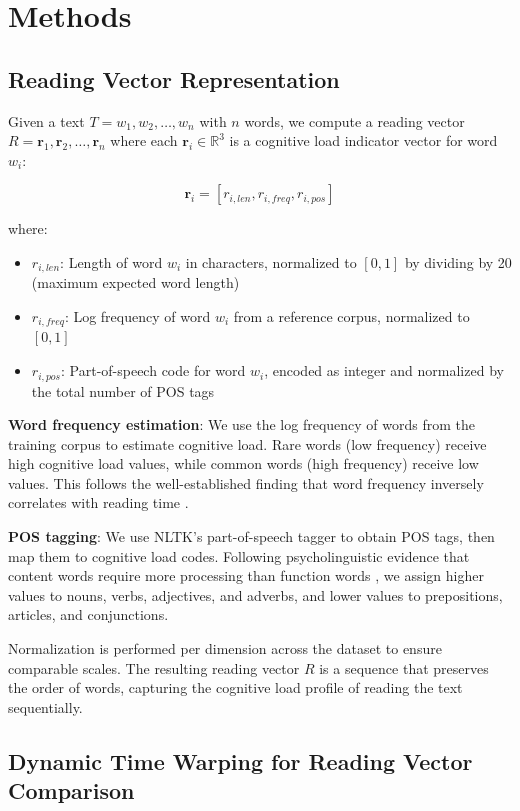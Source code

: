 \documentclass[11pt,letterpaper]{article}
\begin{document}
\section{Methods}

\subsection{Reading Vector Representation}

Given a text $T = w_1, w_2, \ldots, w_n$ with $n$ words, we compute a reading vector $R = \mathbf{r}_1, \mathbf{r}_2, \ldots, \mathbf{r}_n$ where each $\mathbf{r}_i \in \mathbb{R}^3$ is a cognitive load indicator vector for word $w_i$:

$$\mathbf{r}_i = [r_{i,len}, r_{i,freq}, r_{i,pos}]$$

where:
\begin{itemize}
\item $r_{i,len}$: Length of word $w_i$ in characters, normalized to $[0, 1]$ by dividing by 20 (maximum expected word length)
\item $r_{i,freq}$: Log frequency of word $w_i$ from a reference corpus, normalized to $[0, 1]$
\item $r_{i,pos}$: Part-of-speech code for word $w_i$, encoded as integer and normalized by the total number of POS tags
\end{itemize}

\textbf{Word frequency estimation}: We use the log frequency of words from the training corpus to estimate cognitive load. Rare words (low frequency) receive high cognitive load values, while common words (high frequency) receive low values. This follows the well-established finding that word frequency inversely correlates with reading time \cite{Kuperman2013}.

\textbf{POS tagging}: We use NLTK's part-of-speech tagger to obtain POS tags, then map them to cognitive load codes. Following psycholinguistic evidence that content words require more processing than function words \cite{Kuperman2013}, we assign higher values to nouns, verbs, adjectives, and adverbs, and lower values to prepositions, articles, and conjunctions.

Normalization is performed per dimension across the dataset to ensure comparable scales. The resulting reading vector $R$ is a sequence that preserves the order of words, capturing the cognitive load profile of reading the text sequentially.

\subsection{Dynamic Time Warping for Reading Vector Comparison}
\end{document}
